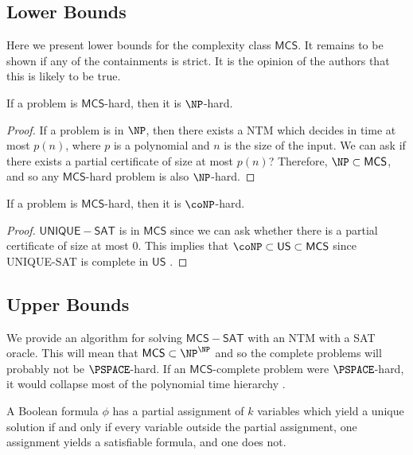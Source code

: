\documentclass[runningheads,a4paper]{llncs}
\begin{document}
\begin{definition}
\subsection{Lower Bounds}

Here we present lower bounds for the complexity class $\mathsf{MCS}$. It remains to be shown if any of the containments is strict. It is the opinion of the authors that this is likely to be true. 

\begin{proposition}
If a problem is $\mathsf{MCS}$-hard, then it is $\NP$-hard.
\end{proposition}

\begin{proof}
If a problem is in $\NP$, then there exists a NTM which decides in time at most $p(n)$, where $p$ is a polynomial and $n$ is the size of the input. We can ask if there exists a partial certificate of size at most $p(n)$? Therefore, $\NP \subset \mathsf{MCS}$, and so any $\mathsf{MCS}$-hard problem is also $\NP$-hard. 
\end{proof}

\begin{proposition}
If a problem is $\mathsf{MCS}$-hard, then it is $\coNP$-hard. 
\end{proposition}

\begin{proof}
$\mathsf{UNIQUE-SAT}$ is in $\mathsf{MCS}$ since we can ask whether there is a partial certificate of size at most $0$. This implies that $\coNP \subset \mathsf{US} \subset \mathsf{MCS}$ since UNIQUE-SAT is complete in $\mathsf{US}$ \cite{blass1982unique}.
\end{proof}

\subsection{Upper Bounds}

We provide an algorithm for solving $\mathsf{MCS-SAT}$ with an NTM with a SAT oracle. This will mean that $\mathsf{MCS} \subset \NP^{\NP}$ and so the complete problems will probably not be $\PSPACE$-hard. If an $\mathsf{MCS}$-complete problem were $\PSPACE$-hard, it would collapse most of the polynomial time hierarchy \cite{stockmeyer1976polynomial}. 

\begin{lemma}
A Boolean formula $\phi$ has a partial assignment of $k$ variables which yield a unique solution if and only if every variable outside the partial assignment, one assignment yields a satisfiable formula, and one does not.
\end{lemma}


\end{definition}
\end{document}
